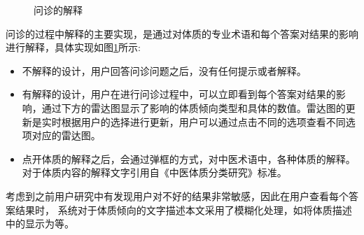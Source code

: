 \begin{figure}[htbp]
    \caption{问诊的解释} 
    \label{fig:questions}
\end{figure}

问诊的过程中解释的主要实现，是通过对体质的专业术语和每个答案对结果的影响进行解释，具体实现如图\ref{fig:questions}所示:
\begin{itemize}
    \item 不解释的设计，用户回答问诊问题之后，没有任何提示或者解释。
    \item 有解释的设计，用户在进行问诊过程中，可以立即看到每个答案对结果的影响，通过下方的雷达图显示了影响的体质倾向类型和具体的数值。雷达图的更新是实时根据用户的选择进行更新，用户可以通过点击不同的选项查看不同选项对应的雷达图。
    \item 点开体质的解释之后，会通过弹框的方式，对中医术语中，各种体质的解释。对于体质内容的解释文字引用自《中医体质分类研究》标准。
\end{itemize}

考虑到之前用户研究中有发现用户对不好的结果非常敏感，因此在用户查看每个答案结果时，
系统对于体质倾向的文字描述本文采用了模糊化处理，如将体质描述中的显示为等。


